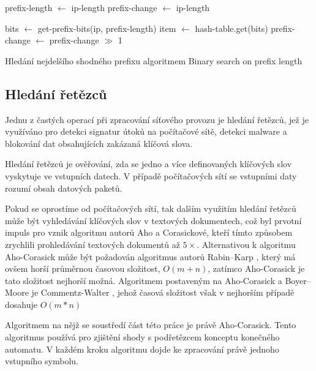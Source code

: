 \begin{algorithm}
	prefix-length $\leftarrow$ ip-length\;
	prefix-change $\leftarrow$ ip-length\;
	{
		bits $\leftarrow$ get-prefix-bits(ip, prefix-length)\;
		item $\leftarrow$ hash-table.get(bits)\;
		prefix-change $\leftarrow$ prefix-change $\gg$ 1\;

	}
	\caption{Hledání nejdelšího shodného prefixu algoritmem Binary search on prefix length}
\end{algorithm}

\subsection{Hledání řetězců} %

Jednu z častých operací při zpracování síťového provozu je hledání řetězců, jež je využíváno pro detekci
signatur útoků na počítačové sítě, detekci malware a blokování dat obsahujících zakázaná klíčová slova.

Hledání řetězců je ověřování, zda se jedno a více definovaných klíčových slov vyskytuje ve vstupních
datech. V případě počítačových sítí se vstupními daty rozumí obsah datových paketů.

Pokud se oprostíme od počítačových sítí, tak dalším využitím hledání řetězců může být
vyhledávání klíčových slov v textových dokumentech, což byl prvotní impuls pro vznik
algoritmu autorů Aho a Corasickové, kteří tímto způsobem zrychlili prohledávání
textových dokumentů až $5\times$. Alternativou k algoritmu Aho-Corasick může být požadován
algoritmus autorů Rabin–Karp \cite{rabin-karp}, který má ovšem horší průměrnou časovou složitost, $O(m+n)$,
zatímco Aho-Corasick je tato složitost nejhorší možná. Algoritmem postaveným na Aho-Corasick
a Boyer–Moore \cite{boyer-moore}
je Commentz-Walter \cite{walter}, jehož časová složitost však v nejhorším případě dosahuje $O(m*n)$

Algoritmem na nějž se soustředí část této práce je právě Aho-Corasick.
Tento algoritmus používá pro zjištění shody s podřetězcem konceptu konečného automatu.
V každém kroku algoritmu dojde ke zpracování právě jednoho vstupního symbolu.

